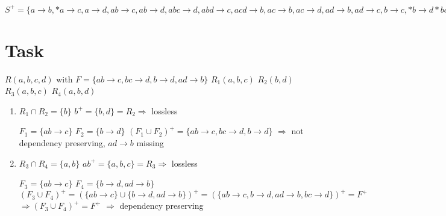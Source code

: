\documentclass{article}
\begin{document}
$S^{+} = \{
            a \rightarrow b, *
            a \rightarrow c, 
            a \rightarrow d, 
            ab \rightarrow c, 
            ab \rightarrow d, 
            abc \rightarrow d, 
            abd \rightarrow c, 
            acd \rightarrow b, 
            ac \rightarrow b, 
            ac \rightarrow d, 
            ad \rightarrow b, 
            ad \rightarrow c, 
            b \rightarrow c, *
            b \rightarrow d *
            bc \rightarrow d
            bd \rightarrow c
        \}$

\newpage
\section{Task}
$R(a, b, c, d)$ with $F = \{ ab \rightarrow c, bc \rightarrow d, b \rightarrow d, ad \rightarrow b \}$ \newline
$R_{1}(a, b, c)$  \newline
$R_{2}(b, d)$ \newline
$R_{3}(a, b, c)$ \newline
$R_{4}(a, b, d)$ \newline

\begin{enumerate}
    \item 
    $R_{1} \cap R_{2} = \{b\}$ \newline
    $b^{+} = \{b, d\} = R_{2} \Rightarrow $ lossless

    $F_{1} = \{ab \rightarrow c\}$ \newline
    $F_{2} = \{b \rightarrow d\}$ \newline
    $(F_{1} \cup F_{2})^{+} = \{ab \rightarrow c, bc \rightarrow d, b \rightarrow d\}$ \newline
    $\Rightarrow$ not dependency preserving, $ad \rightarrow b$ missing
    \item 
    $R_{3} \cap R_{4} = \{a, b\}$ \newline
    $ab^{+} = \{a, b, c\} = R_{3} \Rightarrow $ lossless

    $F_{3} = \{ab \rightarrow c\}$ \newline
    $F_{4} = \{b \rightarrow d, ad \rightarrow b \}$ \newline
    $(F_{3} \cup F_{4})^{+} 
    = (\{ab \rightarrow c\} \cup \{b \rightarrow d, ad \rightarrow b \})^{+} 
    = (\{ab \rightarrow c, b \rightarrow d, ad \rightarrow b , bc \rightarrow d\} )^{+} 
    = F^{+}$ \newline
    $\Rightarrow(F_{3} \cup F_{4})^{+} = F^{+}$
    $\Rightarrow$ dependency preserving
\end{enumerate}
\end{document}
